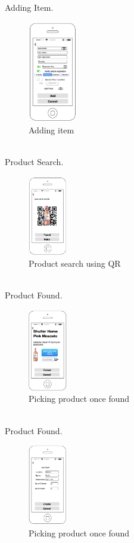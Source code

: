 \\Adding Item.
\begin{figure}[h!]
                	\centering
                   	\includegraphics[width=0.19\textwidth]{images/adding}
                    \caption{Adding item}
                \end{figure}
                
\pagebreak
\\Product Search.
\begin{figure}[h!]
                	\centering
                   	\includegraphics[width=0.15\textwidth]{images/search}
                    \caption{Product search using QR}
                \end{figure}
\\Product Found.
\begin{figure}[h!]
                	\centering
                   	\includegraphics[width=0.15\textwidth]{images/pick}
                    \caption{Picking product once found}
                \end{figure}

\\Product Found.
\begin{figure}[h!]
                	\centering
                   	\includegraphics[width=0.15\textwidth]{images/shelf}
                    \caption{Picking product once found}
                \end{figure}
